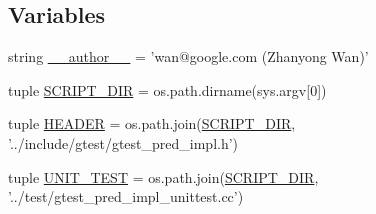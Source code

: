 \subsection*{Variables}
\begin{DoxyCompactItemize}
\item 
string \hyperlink{namespacegen__gtest__pred__impl_af32e92d473ee6c427929cb7ddb4db7e6}{\-\_\-\-\_\-author\-\_\-\-\_\-} = 'wan@google.\-com (Zhanyong Wan)'
\item 
tuple \hyperlink{namespacegen__gtest__pred__impl_a60983047285657dc05c7df4189780580}{S\-C\-R\-I\-P\-T\-\_\-\-D\-I\-R} = os.\-path.\-dirname(sys.\-argv\mbox{[}0\mbox{]})
\item 
tuple \hyperlink{namespacegen__gtest__pred__impl_aab0c5147255ea91bb78a787c0c75e979}{H\-E\-A\-D\-E\-R} = os.\-path.\-join(\hyperlink{namespacegen__gtest__pred__impl_a60983047285657dc05c7df4189780580}{S\-C\-R\-I\-P\-T\-\_\-\-D\-I\-R}, '../include/gtest/gtest\-\_\-pred\-\_\-impl.\-h')
\item 
tuple \hyperlink{namespacegen__gtest__pred__impl_a88e9ea29c82704eab46ccc3e1e3468c8}{U\-N\-I\-T\-\_\-\-T\-E\-S\-T} = os.\-path.\-join(\hyperlink{namespacegen__gtest__pred__impl_a60983047285657dc05c7df4189780580}{S\-C\-R\-I\-P\-T\-\_\-\-D\-I\-R}, '../test/gtest\-\_\-pred\-\_\-impl\-\_\-unittest.\-cc')
\end{DoxyCompactItemize}


